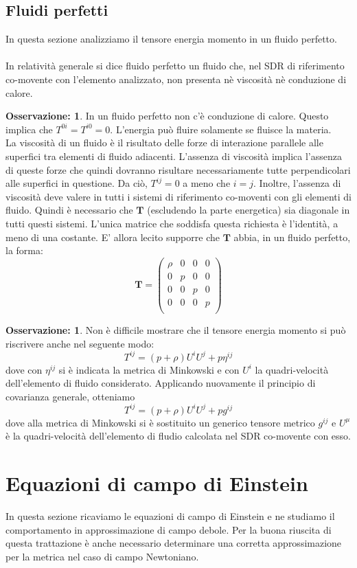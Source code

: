 \documentclass[]{report}
\theoremstyle{definition}
\theoremstyle{Theorem}
\theoremstyle{definition}
\theoremstyle{definition}
\theoremstyle{definition}
\newtheorem{Obs}[Def]{Osservazione:}
\begin{document}
\subsection{Fluidi perfetti}
In questa sezione analizziamo il tensore energia momento in un fluido perfetto.\\
\\
In relatività generale si dice fluido perfetto un fluido che, nel SDR di riferimento co-movente con l'elemento analizzato, non presenta nè viscosità nè conduzione di calore.
\begin{Obs}
	In un fluido perfetto non c'è conduzione di calore. Questo implica che $T^{0i}=T^{i0}=0$. L'energia può fluire solamente se fluisce la materia.\\
	La viscosità di un fluido è il risultato delle forze di interazione parallele alle superfici tra elementi di fluido adiacenti. L'assenza di viscosità implica l'assenza di queste forze che quindi dovranno risultare necessariamente tutte perpendicolari alle superfici in questione. Da ciò, $T^{ij}=0$ a meno che $i=j$.
	Inoltre, l'assenza di viscosità deve valere in tutti i sistemi di riferimento co-moventi con gli elementi di fluido. Quindi è necessario che $\textbf{T}$ (escludendo la parte energetica) sia diagonale in tutti questi sistemi. L'unica matrice che soddisfa questa richiesta è l'identità, a meno di una costante. E' allora lecito supporre che $\textbf{T}$ abbia, in un fluido perfetto, la forma:
	$$\textbf{T}=\begin{pmatrix}
		\rho & 0 & 0 &0\\
		0 & p & 0 &0\\
		0 & 0 & p &0\\
		0 & 0 & 0 &p\\
	\end{pmatrix}$$	
\end{Obs}
\begin{Obs}
	Non è difficile mostrare che il tensore energia momento si può riscrivere anche nel seguente modo:
	$$T^{ij}=(p+\rho)U^iU^j+p\eta^{ij}$$
	dove con $\eta^{ij}$ si è indicata la metrica di Minkowski e con $U^i$ la quadri-velocità dell'elemento di fluido considerato. Applicando nuovamente il principio di covarianza generale, otteniamo
	$$T^{ij}=(p+\rho)U^iU^j+pg^{ij}$$
	dove alla metrica di Minkowski si è sostituito un generico tensore metrico $g^{ij}$ e $U^\mu$ è la quadri-velocità dell'elemento di fludio calcolata nel SDR co-movente con esso.
\end{Obs}
\section{Equazioni di campo di Einstein}
In questa sezione ricaviamo le equazioni di campo di Einstein e ne studiamo il comportamento in approssimazione di campo debole. Per la buona riuscita di questa trattazione è anche necessario determinare una corretta approssimazione per la metrica nel caso di campo Newtoniano.
\end{document}
